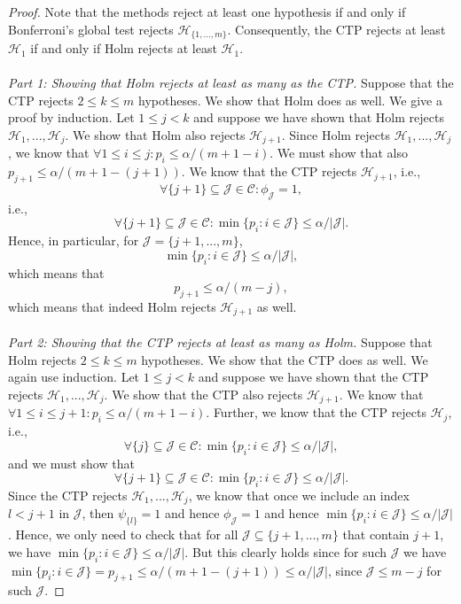 \documentclass[10pt,a4paper]{amsart}
\newcommand{\Hy}{\mathcal{H}}
\newcommand{\J}{\mathcal{J}}
\newcommand{\subs}{\mathcal{C}}
\begin{document}
\begin{proof}
Note that  the methods reject at least one hypothesis if and only if Bonferroni's global test rejects $\Hy_{\{1,...,m\}}$.
Consequently,  the  CTP rejects at least $\Hy_{1}$ if and only if   Holm rejects at least $\Hy_{1}$.
\\
\\
\emph{Part 1: Showing that  Holm rejects at least as many as the CTP.}
Suppose that the CTP rejects $2\leq k \leq m$ hypotheses. We show that Holm does as well.
We give a proof by induction.
Let $1\leq j< k$ and suppose we have shown that Holm rejects $\Hy_1,...,\Hy_j$. We show that Holm also rejects $\Hy_{j+1}$.
Since Holm rejects  $\Hy_1,...,\Hy_j$, we know that $\forall 1\leq i\leq j:  p_i\leq \alpha/(m+1-i)$. We must show that also 
$p_{j+1}\leq \alpha/(m+1-(j+1))$. We know that the CTP rejects $\Hy_{j+1}$, i.e., 
$$ \forall \{{j+1}\} \subseteq \J \in \subs: \phi_{\J}=1  ,$$
i.e., 
$$ \forall\{{j+1}\} \subseteq \J \in \subs: \min\{p_i: i\in \J\}\leq \alpha/ |\J|.$$
Hence, in particular, for $\J=\{j+1,...,m\}$,
$$\min\{p_i: i\in \J\}\leq \alpha/ |\J|,$$
which means that
$$p_{j+1}\leq \alpha/ (m-j),$$ which means that indeed Holm rejects $\Hy_{j+1}$ as well.
\\
\\
\emph{Part 2: Showing that  the CTP rejects at least as many as Holm.}
Suppose that Holm rejects $2\leq k \leq m$ hypotheses. We show that the CTP does as well. We again use induction.
Let $1\leq j< k$ and suppose we have shown that the CTP  rejects $\Hy_1,...,\Hy_j$. We show that the CTP also rejects $\Hy_{j+1}$.
We know that 
$\forall 1\leq i\leq j+1:  p_i\leq \alpha/(m+1-i)$.
Further, we know that the CTP rejects $\Hy_j$, i.e.,
 $$\forall\{{j}\} \subseteq \J \in \subs: \min\{p_i: i\in \J\}\leq \alpha/ |\J|,$$
and we must show that 
$$ \forall\{{j+1}\} \subseteq \J \in \subs: \min\{p_i: i\in \J\}\leq \alpha/ |\J|.$$
Since the CTP rejects $\Hy_1,...,\Hy_j$, we know that once we include an index $l<j+1$ in $\J$, then $\psi_{\{l\}}=1$ and hence  $\phi_{\J}=1$ and hence  $\min\{p_i: i\in \J\}\leq \alpha/ |\J|$.
Hence, we only need to check that for all $\J\subseteq\{j+1,...,m\}$ that contain $j+1$, we have $\min\{p_i: i\in \J\}\leq \alpha/ |\J|$. But this clearly holds since for such $\J$ we have  $\min\{p_i: i\in \J\}=p_{j+1}\leq \alpha/(m+1-(j+1))\leq \alpha/|\J|$, since $\J\leq m-j$ for such $\J$.
\end{proof}
\end{document}
